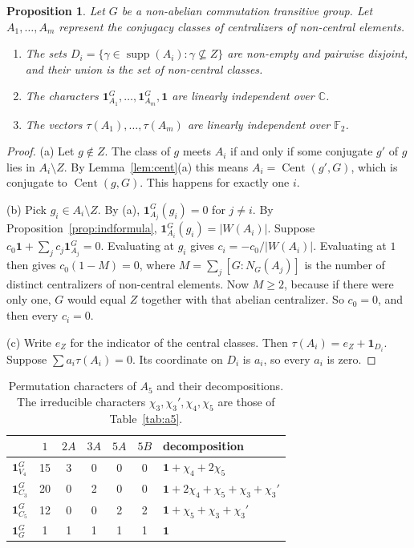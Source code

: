 \documentclass[12pt,letterpaper]{article}
\numberwithin{equation}{section}
\theoremstyle{plain}
\newtheorem{proposition}[theorem]{Proposition}
\theoremstyle{definition}
\newcommand{\F}{\mathbb{F}}
\newcommand{\C}{\mathbb{C}}
\DeclareMathOperator{\Cent}{Cent}
\DeclareMathOperator{\supp}{supp}
\newcommand{\triv}{\mathbf{1}}
\begin{document}
\begin{proposition}\label{prop:indep}
Let $G$ be a non-abelian commutation transitive group. Let $A_1,\dots,A_m$
represent the conjugacy classes of centralizers of non-central elements.
\begin{enumerate}[label=(\alph*),itemsep=1pt]
\item The sets $D_i=\{\gamma\in\supp(A_i):\gamma\not\subseteq Z\}$ are
  non-empty and pairwise disjoint, and their union is the set of
  non-central classes.
\item The characters $\triv_{A_1}^G,\dots,\triv_{A_m}^G,\triv$ are linearly
  independent over $\C$.
\item The vectors $\tau(A_1),\dots,\tau(A_m)$ are linearly independent over
  $\F_2$.
\end{enumerate}
\end{proposition}

\begin{proof}
(a) Let $g\notin Z$. The class of $g$ meets $A_i$ if and only if some
conjugate $g'$ of $g$ lies in $A_i\setminus Z$. By Lemma~\ref{lem:cent}(a)
this means $A_i=\Cent(g',G)$, which is conjugate to $\Cent(g,G)$. This
happens for exactly one $i$.

(b) Pick $g_i\in A_i\setminus Z$. By (a), $\triv_{A_j}^G(g_i)=0$ for
$j\neq i$. By Proposition~\ref{prop:indformula}, $\triv_{A_i}^G(g_i)=
|W(A_i)|$. Suppose $c_0\triv+\sum_jc_j\triv_{A_j}^G=0$. Evaluating at
$g_i$ gives $c_i=-c_0/|W(A_i)|$. Evaluating at $1$ then gives
$c_0(1-M)=0$, where $M=\sum_j[G:N_G(A_j)]$ is the number of distinct
centralizers of non-central elements. Now $M\ge2$, because if there were
only one, $G$ would equal $Z$ together with that abelian centralizer. So
$c_0=0$, and then every $c_i=0$.

(c) Write $e_Z$ for the indicator of the central classes. Then
$\tau(A_i)=e_Z+\triv_{D_i}$. Suppose $\sum a_i\tau(A_i)=0$. Its coordinate
on $D_i$ is $a_i$, so every $a_i$ is zero.
\end{proof}

\begin{table}[ht]
\centering
\caption{Permutation characters of $A_5$ and their decompositions. The
irreducible characters $\chi_3,\chi_3',\chi_4,\chi_5$ are those of
Table~\ref{tab:a5}.}\label{tab:a5perm}
\begin{tabular}{lccccc l}
\toprule
& $1$ & $2A$ & $3A$ & $5A$ & $5B$ & decomposition\\
\midrule
$\triv_{V_4}^G$ & 15 & 3 & 0 & 0 & 0 & $\triv+\chi_4+2\chi_5$\\
$\triv_{C_3}^G$ & 20 & 0 & 2 & 0 & 0 & $\triv+2\chi_4+\chi_5+\chi_3+\chi_3'$\\
$\triv_{C_5}^G$ & 12 & 0 & 0 & 2 & 2 & $\triv+\chi_5+\chi_3+\chi_3'$\\
$\triv_{G}^G$ & 1 & 1 & 1 & 1 & 1 & $\triv$\\
\bottomrule
\end{tabular}
\end{table}
\end{document}
